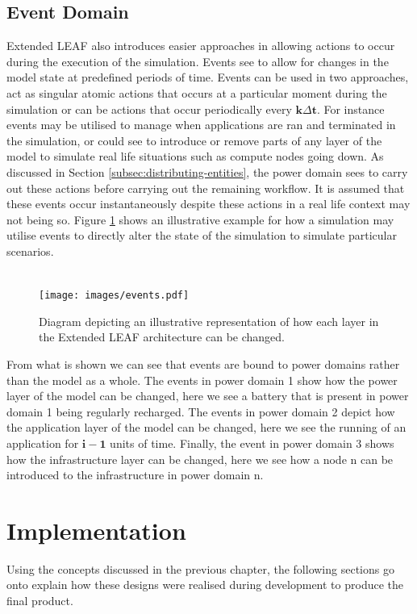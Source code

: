 \documentclass{l4proj}
\begin{document}
\section{Event Domain}\label{sec:events}
Extended LEAF also introduces easier approaches in allowing actions to occur during the execution of the simulation.
Events see to allow for changes in the model state at predefined periods of time.
Events can be used in two approaches, act as singular atomic actions that occurs at a particular moment during the simulation or can be actions that occur periodically every $\mathbf{k\varDelta t}$.
For instance events may be utilised to manage when applications are ran and terminated in the simulation, or could see to introduce or remove parts of any layer of the model to simulate real life situations such as compute nodes going down.
As discussed in Section \ref{subsec:distributing-entities}, the power domain sees to carry out these actions before carrying out the remaining workflow.
It is assumed that these events occur instantaneously despite these actions in a real life context may not being so.
Figure \ref{fig:events} shows an illustrative example for how a simulation may utilise events to directly alter the state of the simulation to simulate particular scenarios.\\ \\
\begin{figure}[h]
    \centering
    \texttt{[image: images/events.pdf]}
    ~
    \caption{Diagram depicting an illustrative representation of how each layer in the Extended LEAF architecture can be changed.}
    \label{fig:events}
\end{figure}
From what is shown we can see that events are bound to power domains rather than the model as a whole.
The events in power domain 1 show how the power layer of the model can be changed, here we see a battery that is present in power domain 1 being regularly recharged.
The events in power domain 2 depict how the application layer of the model can be changed, here we see the running of an application for $\mathbf{i - 1}$ units of time.
Finally, the event in power domain 3 shows how the infrastructure layer can be changed, here we see how a node n can be introduced to the infrastructure in power domain n.

\chapter{Implementation}
Using the concepts discussed in the previous chapter, the following sections go onto explain how these designs were realised during development to produce the final product.
\end{document}
